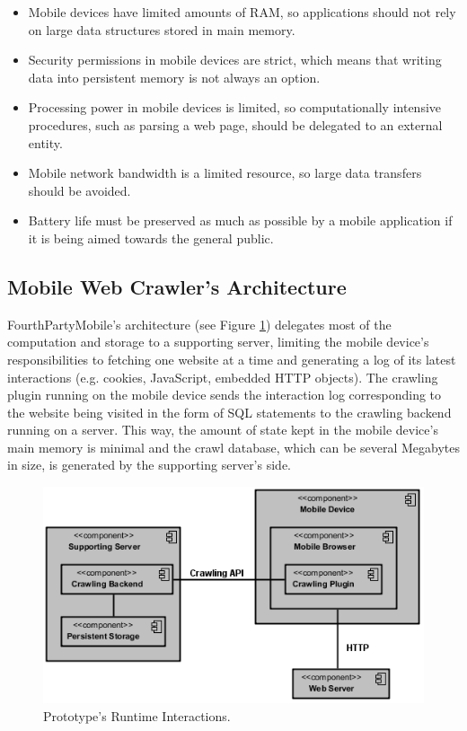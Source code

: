 \documentclass{acm_proc_article-sp}
\begin{document}
\begin{itemize}
\item Mobile devices have limited amounts of RAM, so applications should not rely on large data structures stored in main memory.

\item Security permissions in mobile devices are strict, which means that writing data into persistent memory is not always an option.

\item Processing power in mobile devices is limited, so computationally intensive procedures, such as parsing a web page, should be delegated to an external entity.

\item Mobile network bandwidth is a limited resource, so large data transfers should be avoided.

\item Battery life must be preserved as much as possible by a mobile application if it is being aimed towards the general public.
\end{itemize}


\subsection{Mobile Web Crawler's Architecture}

FourthPartyMobile's architecture (see Figure \ref{fig:component_diagram}) delegates most of the computation and storage to a supporting server, limiting the mobile device’s responsibilities to fetching one website at a time and generating a log of its latest interactions (e.g. cookies, JavaScript, embedded HTTP objects). The crawling plugin running on the mobile device sends the interaction log corresponding to the website being visited in the form of SQL statements to the crawling backend running on a server. This way, the amount of state kept in the mobile device’s main memory is minimal and the crawl database, which can be several Megabytes in size, is generated by the supporting server's side. 

\begin{figure}[h] 
\centering \includegraphics[scale=0.70]{diagrams/component_diagram.png}
\caption{Prototype's Runtime Interactions.}
\label{fig:component_diagram}
\end{figure}
\end{document}

